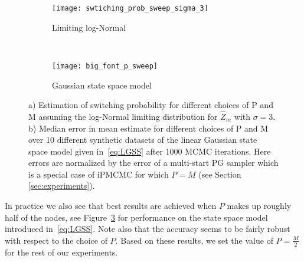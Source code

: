 \begin{figure}[t]
	\centering
	\begin{subfigure}[t]{0.4\textwidth}
		\texttt{[image: swtiching\_prob\_sweep\_sigma\_3]}
		\caption{Limiting log-Normal\label{fig:theSwitchingProb}}
	\end{subfigure}
	~~~~~~~~~~~
	\begin{subfigure}[t]{0.4\textwidth}
		\texttt{[image: big\_font\_p\_sweep]}
		\caption{Gaussian state space model\label{fig:Psweep}}
	\end{subfigure}
	\caption{a) Estimation of switching probability for different choices of P and M assuming the log-Normal limiting distribution for $\hat{Z}_m$ with $\sigma=3$. b) Median error in mean estimate for different choices of P and M over 10 different synthetic datasets of the linear Gaussian state space model given in~\eqref{eq:LGSS} after 1000 MCMC iterations. Here errors are normalized by the error of a multi-start PG sampler which is a special case of iPMCMC for which $P=M$ (see Section \ref{sec:experiments}).
	}
\end{figure}

%
%

In practice we also see that best results are achieved when $P$ makes up roughly half of the nodes, see Figure~\ref{fig:Psweep} for performance on the state space model introduced in~\eqref{eq:LGSS}. Note also that the accuracy seems to be fairly robust with respect to the choice of $P$. %
%
Based on these results, we set the value of $P=\frac{M}{2}$ for the rest of our experiments.
